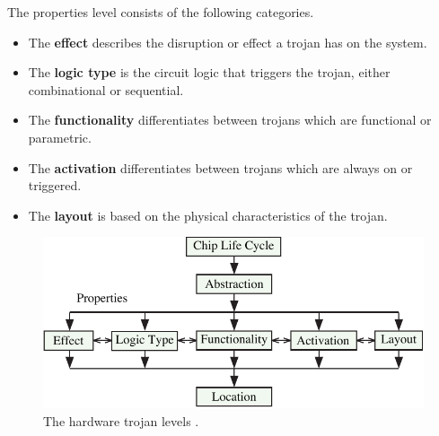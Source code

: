 The properties level consists of the following categories.
\begin{itemize}
	\item The \textbf{effect} describes the disruption or effect a trojan has on the system.
	\item The \textbf{logic type} is the circuit logic that triggers the trojan, either combinational or sequential.
	\item The \textbf{functionality} differentiates between trojans which are functional or parametric.
	\item The \textbf{activation} differentiates between trojans which are always on or triggered.
	\item The \textbf{layout} is based on the physical characteristics of the trojan.
\end{itemize}
\begin{figure}
	\centering
	\includegraphics[width=0.8\linewidth]{figures/trojan_life_cycle}
	\caption{The hardware trojan levels \cite{samerAttribute}.}
	\label{fig:trojan_life_cycle}
\end{figure}

